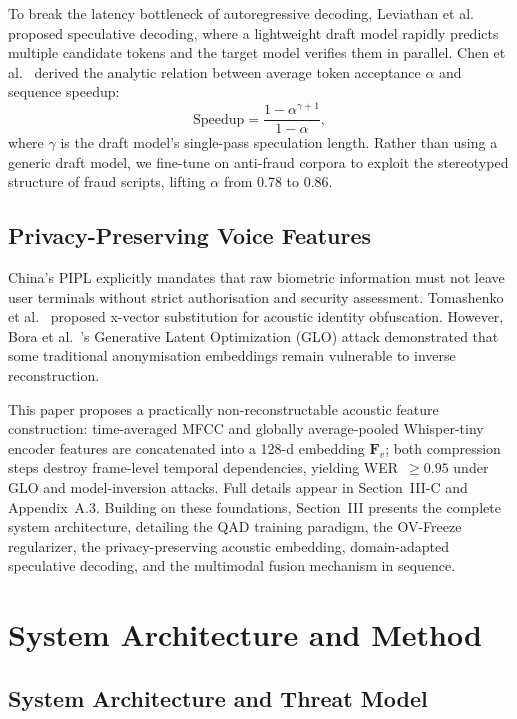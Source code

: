 \documentclass[final,5p,times,number]{elsarticle}
\begin{document}
To break the latency bottleneck of autoregressive decoding, Leviathan et al.~\cite{20} proposed speculative decoding, where a lightweight draft model rapidly predicts multiple candidate tokens and the target model verifies them in parallel. Chen et al.~\cite{21} derived the analytic relation between average token acceptance $\alpha$ and sequence speedup:
\begin{equation}
\label{eq:speedup}
\text{Speedup} = \frac{1-\alpha^{\gamma+1}}{1-\alpha},
\end{equation}
where $\gamma$ is the draft model's single-pass speculation length. Rather than using a generic draft model, we fine-tune on anti-fraud corpora to exploit the stereotyped structure of fraud scripts, lifting $\alpha$ from 0.78 to 0.86.

\subsection{Privacy-Preserving Voice Features}

China's PIPL explicitly mandates that raw biometric information must not leave user terminals without strict authorisation and security assessment. Tomashenko et al.~\cite{22} proposed x-vector substitution for acoustic identity obfuscation. However, Bora et al.~\cite{23}'s Generative Latent Optimization (GLO) attack demonstrated that some traditional anonymisation embeddings remain vulnerable to inverse reconstruction.

This paper proposes a practically non-reconstructable acoustic feature construction: time-averaged MFCC and globally average-pooled Whisper-tiny encoder features are concatenated into a 128-d embedding $\bm{F}_v$; both compression steps destroy frame-level temporal dependencies, yielding WER~$\ge 0.95$ under GLO and model-inversion attacks. Full details appear in Section~III-C and Appendix~A.3. Building on these foundations, Section~III presents the complete system architecture, detailing the QAD training paradigm, the OV-Freeze regularizer, the privacy-preserving acoustic embedding, domain-adapted speculative decoding, and the multimodal fusion mechanism in sequence.

\section{System Architecture and Method}
\subsection{System Architecture and Threat Model}
\end{document}
